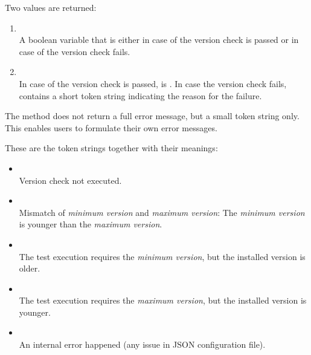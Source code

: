 Two values are returned:

\begin{enumerate}
   \item {}\\
        A boolean variable that is either  in case of the version check is passed or 
        in case of the version check fails.
   \item {}\\
        In case of the version check is passed,  is . In case the version check fails,
         contains a short token string indicating the reason for the failure.
\end{enumerate}

The method  does not return a full error message, but a small token string only.
This enables users to formulate their own error messages.

These are the token strings together with their meanings:

\begin{itemize}
   \item {} \\
         Version check not executed.

   \item {} \\
         Mismatch of \emph{minimum version} and \emph{maximum version}: The \emph{minimum version} is younger
         than the \emph{maximum version}.

   \item {} \\
         The test execution requires the \emph{minimum version}, but the installed version is older.

   \item {} \\
         The test execution requires the \emph{maximum version}, but the installed version is younger.

   \item {} \\
         An internal error happened (any issue in JSON configuration file).
\end{itemize}


